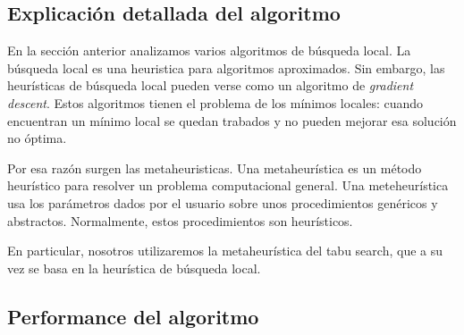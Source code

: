 
\subsection{Explicación detallada del algoritmo}

En la sección anterior analizamos varios algoritmos de búsqueda local.
La búsqueda local es una heuristica para algoritmos aproximados.
Sin embargo, las heurísticas de búsqueda local pueden verse como un algoritmo de \emph{gradient descent}.
Estos algoritmos tienen el problema de los mínimos locales: cuando encuentran un mínimo local se quedan trabados y no pueden mejorar esa solución no óptima. 

Por esa razón surgen las metaheuristicas.
Una metaheurística es un método heurístico para resolver un  problema computacional general.
Una meteheurística usa los parámetros dados por el usuario sobre unos procedimientos genéricos y abstractos. 
Normalmente, estos procedimientos son heurísticos.

En particular, nosotros utilizaremos la metaheurística del tabu search, que a su vez se basa en la heurística de búsqueda local.




\subsection{Performance del algoritmo}


